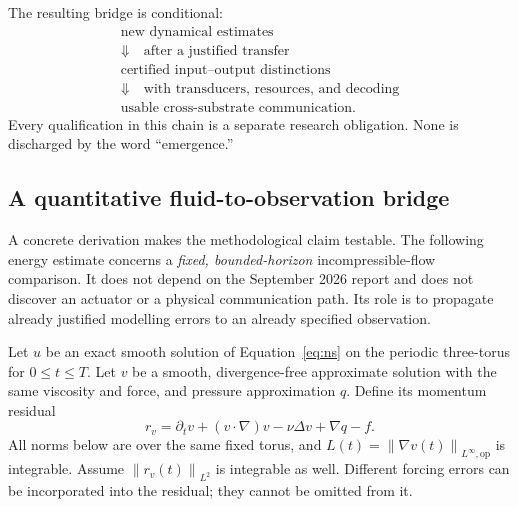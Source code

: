 \documentclass[11pt,a4paper]{article}
\theoremstyle{definition}
\theoremstyle{remark}
\newcommand{\norm}[1]{\left\lVert#1\right\rVert}
\begin{document}
The resulting bridge is conditional:
\begin{equation}\label{eq:bridge}
\begin{gathered}
 \text{new dynamical estimates}\\
 \Downarrow\quad\text{after a justified transfer}\\
 \text{certified input--output distinctions}\\
 \Downarrow\quad\text{with transducers, resources, and decoding}\\
 \text{usable cross-substrate communication}.
\end{gathered}
\end{equation}
Every qualification in this chain is a separate research obligation. None is discharged by the word ``emergence.''

\subsection{A quantitative fluid-to-observation bridge}\label{sec:nsresidual}
A concrete derivation makes the methodological claim testable. The following energy estimate concerns a \emph{fixed, bounded-horizon} incompressible-flow comparison. It does not depend on the September 2026 report and does not discover an actuator or a physical communication path. Its role is to propagate already justified modelling errors to an already specified observation.

Let $u$ be an exact smooth solution of Equation~\eqref{eq:ns} on the periodic three-torus for $0\leq t\leq T$. Let $v$ be a smooth, divergence-free approximate solution with the same viscosity and force, and pressure approximation $q$. Define its momentum residual
\begin{equation}\label{eq:nsresidual}
 r_v=\partial_t v+(v\cdot\nabla)v-\nu\Delta v+\nabla q-f.
\end{equation}
All norms below are over the same fixed torus, and $L(t)=\norm{\nabla v(t)}_{L^\infty,\mathrm{op}}$ is integrable. Assume $\norm{r_v(t)}_{L^2}$ is integrable as well. Different forcing errors can be incorporated into the residual; they cannot be omitted from it.
\end{document}
